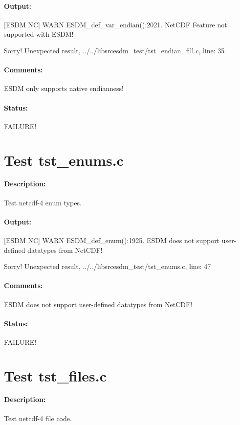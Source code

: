 \paragraph{Output:} [ESDM NC] WARN ESDM\_def\_var\_endian():2021. NetCDF Feature not supported with ESDM!

Sorry! Unexpected result, ../../libsrcesdm\_test/tst\_endian\_fill.c, line: 35

\paragraph{Comments:} ESDM only supports native endianness!

\paragraph{Status:} FAILURE!

\section{Test tst\_enums.c}

\paragraph{Description:} Test netcdf-4 enum types.

\paragraph{Output:} [ESDM NC] WARN ESDM\_def\_enum():1925. ESDM does not support user-defined datatypes from NetCDF!

Sorry! Unexpected result, ../../libsrcesdm\_test/tst\_enums.c, line: 47

\paragraph{Comments:} ESDM does not support user-defined datatypes from NetCDF!

\paragraph{Status:} FAILURE!

\section{Test tst\_files.c}

\paragraph{Description:} Test netcdf-4 file code.

